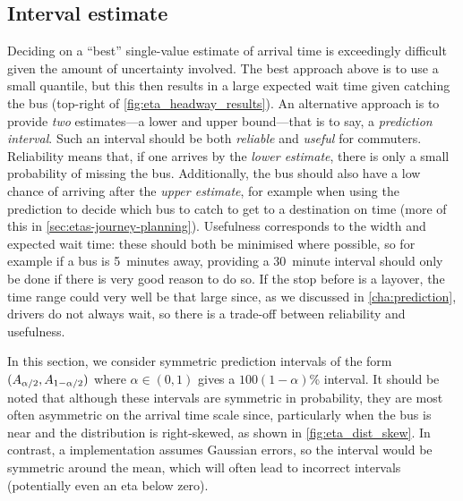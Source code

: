 \subsection{Interval estimate}
\label{sec:etas-interval}


Deciding on a ``best'' single-value estimate of arrival time is exceedingly difficult given the amount of uncertainty involved. The best approach above is to use a small quantile, but this then results in a large expected wait time given catching the bus (top-right of \cref{fig:eta_headway_results}). An alternative approach is to provide \emph{two} estimates---a lower and upper bound---that is to say, a \emph{prediction interval}. Such an interval should be both \emph{reliable} and \emph{useful} for commuters. Reliability means that, if one arrives by the \emph{lower estimate}, there is only a small probability of missing the bus. Additionally, the bus should also have a low chance of arriving after the \emph{upper estimate}, for example when using the prediction to decide which bus to catch to get to a destination on time (more of this in \cref{sec:etas-journey-planning}). Usefulness corresponds to the width and expected wait time: these should both be minimised where possible, so for example if a bus is 5~minutes away, providing a 30~minute interval should only be done if there is very good reason to do so. If the stop before is a layover, the time range could very well be that large since, as we discussed in \cref{cha:prediction}, drivers do not always wait, so there is a trade-off between reliability and usefulness.







In this section, we consider symmetric prediction intervals of the form $(A_{\alpha/2}, A_{1-\alpha/2})$ where $\alpha \in (0,1)$ gives a $100(1-\alpha)$\% interval. It should be noted that although these intervals are symmetric in probability, they are most often asymmetric on the arrival time scale since, particularly when the bus is near and the distribution is right-skewed, as shown in \cref{fig:eta_dist_skew}. In contrast, a \Kf{} implementation assumes Gaussian errors, so the interval would be symmetric around the mean, which will often lead to incorrect intervals (potentially even an \gls{eta} below zero).


